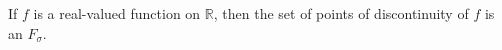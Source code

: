 If $f$ is a real-valued function on $\mathbb{R}$, then the set of points of discontinuity of $f$ is an $F_\sigma$.
